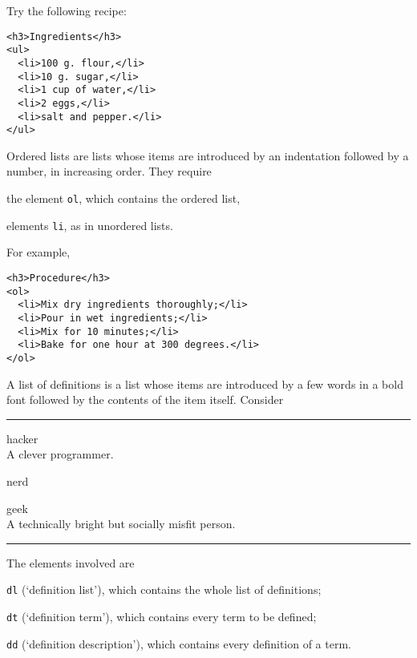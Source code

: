 Try the following recipe:
\begin{verbatim}
<h3>Ingredients</h3>
<ul>
  <li>100 g. flour,</li>
  <li>10 g. sugar,</li>
  <li>1 cup of water,</li>
  <li>2 eggs,</li>
  <li>salt and pepper.</li>
</ul>
\end{verbatim}
Ordered lists are lists whose items are introduced by an indentation
followed by a number, in increasing order. They require
\begin{enumerate*}

  \item the element \texttt{ol}, which contains the ordered list,

  \item elements \texttt{li}, as in unordered lists.

\end{enumerate*}
For example,
\begin{verbatim}
<h3>Procedure</h3>
<ol>
  <li>Mix dry ingredients thoroughly;</li>
  <li>Pour in wet ingredients;</li>
  <li>Mix for 10 minutes;</li>
  <li>Bake for one hour at 300 degrees.</li>
</ol>
\end{verbatim}
A list of definitions is a list whose items are introduced by a few
words in a bold font followed by the contents of the item
itself. Consider
\noindent\rule{\linewidth}{0.5pt}
\begin{description*}

  \item[hacker]\ \\
    A clever programmer.

  \item[nerd]

  \item[geek]\ \\
    A technically bright but socially misfit person.

\end{description*}
\noindent\rule{\linewidth}{0.5pt}
The elements involved are
\begin{itemize*}

  \item \texttt{dl} (`definition list'), which contains the whole
    list of definitions;

  \item \texttt{dt} (`definition term'), which contains every term
    to be defined;

  \item \texttt{dd} (`definition description'), which contains every
    definition of a term.

\end{itemize*}
